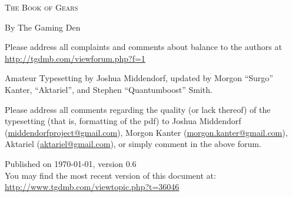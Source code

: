 \pagestyle{plain}

\begin{center} \Huge

\textsc{The Book of Gears}\end{center}

\vspace{2cm}
\begin{center}\large By The Gaming Den\end{center}

\newpage

\vspace*{4in}

\noindent Please address all complaints and comments about balance to the authors at\\
{\color{blue} \href{http://tgdmb.com/viewforum.php?f=1}{http://tgdmb.com/viewforum.php?f=1}}

\vspace{0.2in}



\noindent Amateur Typesetting by Joshua Middendorf, updated by Morgon ``Surgo'' Kanter, ``Aktariel'', and Stephen ``Quantumboost'' Smith.

\vspace{0.15in}

\noindent Please address all comments regarding the quality (or lack thereof) of the typesetting (that is, formatting of the pdf) to Joshua Middendorf (\href{mailto:middendorfproject@gmail.com}{middendorfproject@gmail.com}), Morgon Kanter (\href{mailto:morgon.kanter@gmail.com}{morgon.kanter@gmail.com}), Aktariel (\href{mailto:aktariel@gmail.com}{aktariel@gmail.com}), or simply comment in the above forum.





\vspace{1in}
\noindent Published on \today, version 0.6\\
\noindent You may find the most recent version of this document at:\\
{\color{blue} \href{http://www.tgdmb.com/viewtopic.php?t=36046}{http://www.tgdmb.com/viewtopic.php?t=36046}}

\newpage
